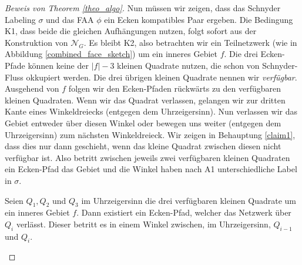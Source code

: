 \begin{proof}[Beweis von Theorem \ref{theo_algo}]
Nun müssen wir zeigen, dass das Schnyder Labeling $\sigma$ und das FAA $\phi$ ein Ecken kompatibles Paar ergeben. Die Bedingung K1, dass beide die gleichen Aufhängungen nutzen, folgt sofort aus der Konstruktion von $\mathcal{N}_G$. Es bleibt K2, also betrachten wir ein Teilnetzwerk (wie in Abbildung \ref{combined_face_sketch}) um ein inneres Gebiet $f$. Die drei Ecken-Pfade können keine der $|f|-3$ kleinen Quadrate nutzen, die schon von Schnyder-Fluss okkupiert werden. Die drei übrigen kleinen Quadrate nennen wir \textit{verfügbar}. Ausgehend von $f$ folgen wir den Ecken-Pfaden rückwärts zu den verfügbaren kleinen Quadraten. Wenn wir das Quadrat verlassen, gelangen wir zur dritten Kante eines Winkeldreiecks (entgegen dem Uhrzeigersinn). Nun verlassen wir das Gebiet entweder über diesen Winkel oder bewegen uns weiter (entgegen dem Uhrzeigersinn) zum nächsten Winkeldreieck. Wir zeigen in Behauptung \ref{claim1}, dass dies nur dann geschieht, wenn das kleine Quadrat zwischen diesen nicht verfügbar ist. Also betritt zwischen jeweils zwei verfügbaren kleinen Quadraten ein Ecken-Pfad das Gebiet und die Winkel haben nach A1 unterschiedliche Label in $\sigma$.

\begin{claim}\label{claim1}
Seien $Q_1,Q_2$ und $Q_3$ im Uhrzeigersinn die drei verfügbaren kleinen Quadrate um ein inneres Gebiet $f$. Dann existiert ein Ecken-Pfad, welcher das Netzwerk über $Q_i$ verlässt. Dieser betritt es in einem Winkel zwischen, im Uhrzeigersinn, $Q_{i-1}$ und $Q_i$.
\end{claim}


\end{proof}
